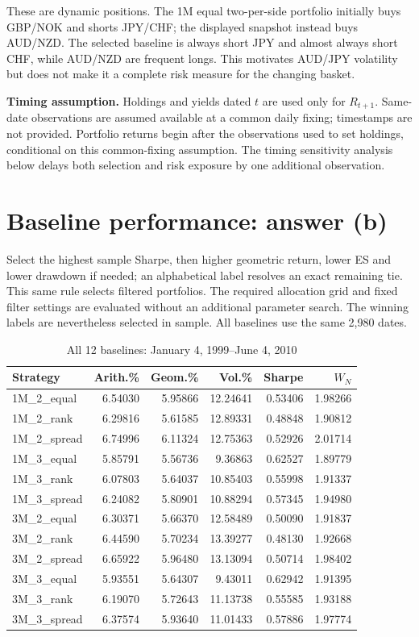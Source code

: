 \documentclass[10pt,letterpaper]{article}
\begin{document}
These are dynamic positions. The 1M equal two-per-side portfolio initially buys GBP/NOK and
shorts JPY/CHF; the displayed snapshot instead buys AUD/NZD. The selected baseline is always
short JPY and almost always short CHF, while AUD/NZD are frequent longs. This motivates
AUD/JPY volatility but does not make it a complete risk measure for the changing basket.

\textbf{Timing assumption.} Holdings and yields dated $t$ are used only for $R_{t+1}$.
Same-date observations are assumed available at a common daily fixing; timestamps are not
provided. Portfolio returns begin after the observations used to set holdings, conditional on
this common-fixing assumption. The timing sensitivity analysis below delays both selection
and risk exposure by one additional observation.
\newpage
\section{Baseline performance: answer (b)}
Select the highest sample Sharpe, then higher geometric return, lower ES and lower drawdown
if needed; an alphabetical label resolves an exact remaining tie. This same rule selects
filtered portfolios. The required allocation grid and fixed filter settings are evaluated without an additional
parameter search. The winning labels are nevertheless selected in sample. All baselines use the same 2,980 dates.
\begin{table}[H]\centering\small\caption{All 12 baselines: January 4, 1999--June 4, 2010}
\begin{tabular}{lrrrrr}\toprule
Strategy & Arith.\% & Geom.\% & Vol.\% & Sharpe & $W_N$\\\midrule
1M\_2\_equal & 6.54030 & 5.95866 & 12.24641 & 0.53406 & 1.98266\\
1M\_2\_rank & 6.29816 & 5.61585 & 12.89331 & 0.48848 & 1.90812\\
1M\_2\_spread & 6.74996 & 6.11324 & 12.75363 & 0.52926 & 2.01714\\
1M\_3\_equal & 5.85791 & 5.56736 & 9.36863 & 0.62527 & 1.89779\\
1M\_3\_rank & 6.07803 & 5.64037 & 10.85403 & 0.55998 & 1.91337\\
1M\_3\_spread & 6.24082 & 5.80901 & 10.88294 & 0.57345 & 1.94980\\
3M\_2\_equal & 6.30371 & 5.66370 & 12.58489 & 0.50090 & 1.91837\\
3M\_2\_rank & 6.44590 & 5.70234 & 13.39277 & 0.48130 & 1.92668\\
3M\_2\_spread & 6.65922 & 5.96480 & 13.13094 & 0.50714 & 1.98402\\
3M\_3\_equal & 5.93551 & 5.64307 & 9.43011 & 0.62942 & 1.91395\\
3M\_3\_rank & 6.19070 & 5.72643 & 11.13738 & 0.55585 & 1.93188\\
3M\_3\_spread & 6.37574 & 5.93640 & 11.01433 & 0.57886 & 1.97774\\
\bottomrule\end{tabular}\end{table}
\end{document}
